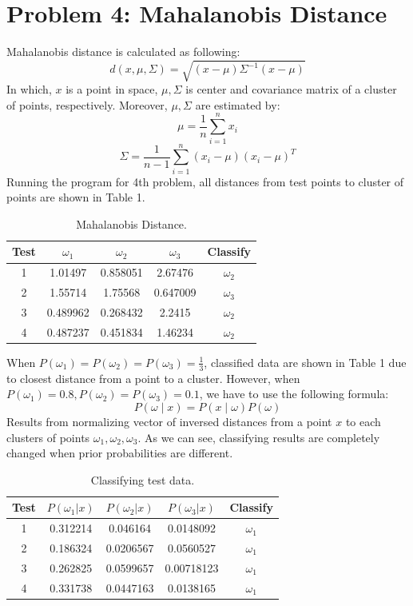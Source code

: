 \documentclass[a4paper, 11pt]{article}
\begin{document}
\section*{Problem 4: Mahalanobis Distance}
Mahalanobis distance is calculated as following:
\[ d(x,\mu, \Sigma) =\sqrt{(x-\mu)\Sigma^{-1}(x-\mu)}\]
In which, $x$ is a point in space, $\mu, \Sigma$ is center and covariance matrix of a cluster of points, respectively. Moreover, $\mu, \Sigma$ are estimated by:
\[ \mu = \frac{1}{n}\sum_{i=1}^{n} x_i\]
\[ \Sigma = \frac{1}{n-1}\sum_{i=1}^{n} (x_i-\mu)(x_i-\mu)^T\]
Running the program for 4th problem, all distances from test points to cluster of points are shown in Table 1.
\begin{table}[ht]
  \centering
  \begin{tabular}{|c|c|c|c|c|}
    \hline
    Test & $\omega_1$ & $\omega_2$  & $\omega_3$ & Classify   \\\hline
    1    & 1.01497    & 0.858051   & 2.67476    & $\omega_2$ \\ \hline
    2    & 1.55714    & 1.75568    & 0.647009   & $\omega_3$ \\  \hline
    3    & 0.489962   & 0.268432   & 2.2415     & $\omega_2$ \\ \hline
    4    & 0.487237   & 0.451834   & 1.46234    & $\omega_2$ \\
    \hline
  \end{tabular}
  \caption{Mahalanobis Distance.}
\end{table}
When $P(\omega_1) = P(\omega_2) = P(\omega_3) = \frac{1}{3}$, classified data are shown in Table 1 due to closest distance from a point to a cluster. However, when $P(\omega_1) = 0.8, P(\omega_2) = P(\omega_3) = 0.1$, we have to use the following formula:
\[P(\omega\mid x) = P(x\mid\omega)P(\omega)\]
Results from normalizing vector of inversed distances from a point $x$ to each clusters of points $\omega_1, \omega_2, \omega_3$. As we can see, classifying results are completely changed when prior probabilities are different.
\begin{table}[ht]
  \centering
  \begin{tabular}{|c|c|c|c|c|}
    \hline
    Test & $P(\omega_1|x)$ & $P(\omega_2|x)$ & $P(\omega_3|x)$ & Classify   \\\hline
    1    & 0.312214        & 0.046164        & 0.0148092       & $\omega_1$ \\ \hline
    2    & 0.186324        & 0.0206567       & 0.0560527       & $\omega_1$ \\ \hline
    3    & 0.262825        & 0.0599657       & 0.00718123      & $\omega_1$ \\ \hline
    4    & 0.331738        & 0.0447163       & 0.0138165       & $\omega_1$ \\ 
    \hline
  \end{tabular}
  \caption{Classifying test data.}
\end{table}
\end{document}
